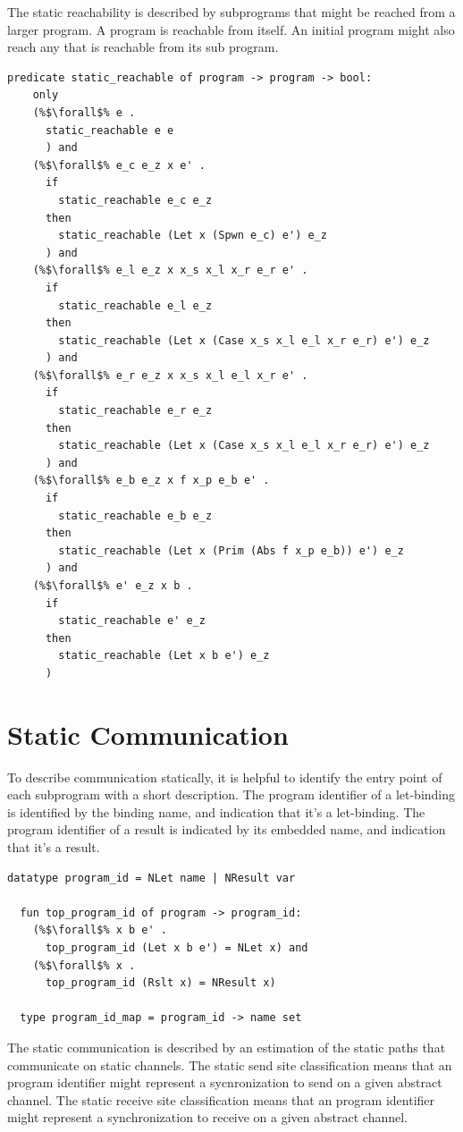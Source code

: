 \documentclass{article}
\begin{document}
The static reachability is described by subprograms that might be reached from a larger
program.  A program is reachable from itself. An initial program might also reach any that is
reachable from its sub program.

\begin{lstlisting}[language=logic, escapechar=\%]
  predicate static_reachable of program -> program -> bool:
    only
    (%$\forall$% e .
      static_reachable e e
      ) and
    (%$\forall$% e_c e_z x e' . 
      if
        static_reachable e_c e_z
      then
        static_reachable (Let x (Spwn e_c) e') e_z
      ) and
    (%$\forall$% e_l e_z x x_s x_l x_r e_r e' . 
      if
        static_reachable e_l e_z
      then
        static_reachable (Let x (Case x_s x_l e_l x_r e_r) e') e_z
      ) and
    (%$\forall$% e_r e_z x x_s x_l e_l x_r e' . 
      if
        static_reachable e_r e_z
      then
        static_reachable (Let x (Case x_s x_l e_l x_r e_r) e') e_z
      ) and
    (%$\forall$% e_b e_z x f x_p e_b e' . 
      if
        static_reachable e_b e_z
      then
        static_reachable (Let x (Prim (Abs f x_p e_b)) e') e_z
      ) and
    (%$\forall$% e' e_z x b . 
      if
        static_reachable e' e_z
      then
        static_reachable (Let x b e') e_z
      )
  \end{lstlisting}


\section{Static Communication}
To describe communication statically, it is helpful to identify the entry
point of each subprogram with a short description. The program identifier of a let-binding is
identified by the binding name, and indication that it's a let-binding. The program identifier
of a result is indicated by its embedded name, and indication that it's a result.

\begin{lstlisting}[language=logic, escapechar=\%]
  datatype program_id = NLet name | NResult var

  fun top_program_id of program -> program_id:
    (%$\forall$% x b e' . 
      top_program_id (Let x b e') = NLet x) and
    (%$\forall$% x . 
      top_program_id (Rslt x) = NResult x)

  type program_id_map = program_id -> name set

\end{lstlisting}

The static communication is described by an estimation of the static paths that communicate on
static channels.
The static send site classification means that an program identifier might represent a
sycnronization to send on a given abstract channel.
The static receive site classification means that an program identifier might represent a
synchronization to receive on a given abstract channel. 
\end{document}
